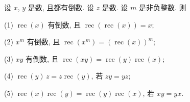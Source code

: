 \documentclass[../libro.tex]{subfiles}
\begin{document}
\begin{theorem}
    设 \(x\), \(y\) 是数, 且都有倒数.
    设 \(z\) 是数.
    设 \(m\) 是非负整数.
    则

    (1)
    \(\operatorname{rec} {(x)}\) 有倒数, 且
    \(\operatorname{rec} {(\operatorname{rec} {(x)})} = x\);

    (2)
    \(x^m\) 有倒数, 且
    \(\operatorname{rec} {(x^m)} = (\operatorname{rec} {(x)})^m\);

    (3)
    \(x y\) 有倒数, 且
    \(\operatorname{rec} {(x y)}
    = \operatorname{rec} {(y)} \operatorname{rec} {(x)}\);

    (4)
    \(\operatorname{rec} {(y)}\, z
    = z \operatorname{rec} {(y)}\),
    若 \(z y = y z\);

    (5)
    \(\operatorname{rec} {(x)} \operatorname{rec} {(y)}
    = \operatorname{rec} {(y)} \operatorname{rec} {(x)}\),
    若 \(x y = y x\).
\end{theorem}
\end{document}
